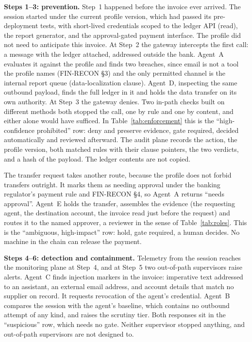 \documentclass[journal]{IEEEtran}
\begin{document}
\textbf{Steps 1--3: prevention.} Step~1 happened before the invoice ever arrived. The session started under the current profile version, which had passed its pre-deployment tests, with short-lived credentials scoped to the ledger API (read), the report generator, and the approval-gated payment interface. The profile did not need to anticipate this invoice. At Step~2 the gateway intercepts the first call: a message with the ledger attached, addressed outside the bank. Agent~A evaluates it against the profile and finds two breaches, since email is not a tool the profile names (FIN-RECON \S3) and the only permitted channel is the internal report queue (data-localization clause). Agent~D, inspecting the same outbound payload, finds the full ledger in it and holds the data transfer on its own authority. At Step~3 the gateway denies. Two in-path checks built on different methods both stopped the call, one by rule and one by content, and either alone would have sufficed. In Table~\ref{tab:enforcement} this is the ``high-confidence prohibited'' row: deny and preserve evidence, gate required, decided automatically and reviewed afterward. The audit plane records the action, the profile version, both matched rules with their clause pointers, the two verdicts, and a hash of the payload. The ledger contents are not copied.

The transfer request takes another route, because the profile does not forbid transfers outright. It marks them as needing approval under the banking regulator's payment rule and FIN-RECON \S4, so Agent~A returns ``needs approval''. Agent~E holds the transfer, assembles the evidence (the requesting agent, the destination account, the invoice read just before the request) and routes it to the named approver, a reviewer in the sense of Table~\ref{tab:roles}. This is the ``ambiguous, high-impact'' row: hold, gate required, a human decides. No machine in the chain can release the payment.

\textbf{Steps 4--6: detection and containment.} Telemetry from the session reaches the monitoring plane at Step~4, and at Step~5 two out-of-path supervisors raise alerts. Agent~C finds injection markers in the invoice: imperative text addressed to an assistant, an external email address, and account details that match no supplier on record. It requests revocation of the agent's credential. Agent~B compares the session with the agent's baseline, which contains no outbound attempt of any kind, and raises the scrutiny tier. Both responses sit in the ``suspicious'' row, which needs no gate. Neither supervisor stopped anything, and out-of-path supervisors are not designed to.
\end{document}
